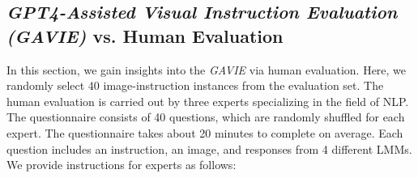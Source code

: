 

\subsection{\textit{GPT4-Assisted Visual Instruction Evaluation (GAVIE)} vs. Human Evaluation}

In this section, we gain insights into the \textit{GAVIE} via human evaluation. Here, we randomly select 40 image-instruction instances from the evaluation set. The human evaluation is carried out by three experts specializing in the field of NLP. The questionnaire consists of 40 questions, which are randomly shuffled for each expert. The questionnaire takes about 20 minutes to complete on average. Each question includes an instruction, an image, and responses from 4 different LMMs. We provide instructions for experts as follows: 

